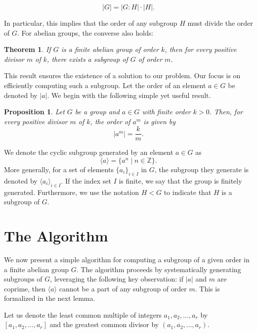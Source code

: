 \documentclass[11pt]{article}
\newtheorem{theorem}{Theorem}[section]
\newtheorem{proposition}{Proposition}[section]
\begin{document}
	\[
	|G| = |G:H| \cdot |H|.
	\]  
	
	In particular, this implies that the order of any subgroup \( H \) must divide the order of \( G \). For abelian groups, the converse also holds:  
	
	\begin{theorem}
		If \( G \) is a finite abelian group of order \( k \), then for every positive divisor \( m \) of \( k \), there exists a subgroup of \( G \) of order \( m \).
	\end{theorem}
	
	This result ensures the existence of a solution to our problem. Our focus is on efficiently computing such a subgroup. Let the order of an element \( a \in G \) be denoted by \( |a| \). We begin with the following simple yet useful result.
	
	\begin{proposition}\label{ordthm}
		Let \( G \) be a group and \( a \in G \) with finite order \( k > 0 \). Then, for every positive divisor \( m \) of \( k \), the order of \( a^m \) is given by  
		\[
		|a^m| = \frac{k}{m}.
		\]
	\end{proposition}
	
	We denote the cyclic subgroup generated by an element \( a \in G \) as  
	\[
	\langle a \rangle = \{ a^n \mid n \in \mathbb{Z} \}.
	\]  
	More generally, for a set of elements \( \{ a_i \}_{i \in I} \) in \( G \), the subgroup they generate is denoted by \( \langle a_i \rangle_{i \in I} \). If the index set \( I \) is finite, we say that the group is finitely generated. Furthermore, we use the notation \( H < G \) to indicate that \( H \) is a subgroup of \( G \).
	
	\section{The Algorithm}  
	
	We now present a simple algorithm for computing a subgroup of a given order in a finite abelian group \( G \). The algorithm proceeds by systematically generating subgroups of \( G \), leveraging the following key observation: if \( |a| \) and \( m \) are coprime, then \( \langle a \rangle \) cannot be a part of any subgroup of order \( m \). This is formalized in the next lemma.
	
	Let us denote the least common multiple of integers \( a_1, a_2, \dots, a_r \) by \( [a_1, a_2, \dots, a_r] \) and the greatest common divisor by \( (a_1, a_2, \dots, a_r) \).
	
\end{document}
